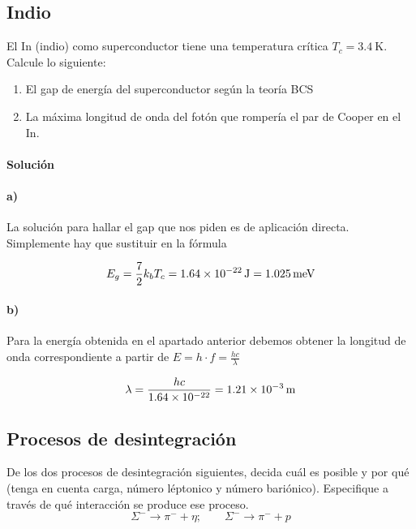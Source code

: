 \documentclass[12pt, a4paper]{article}
\begin{document}
    \subsection{Indio}
    El In (indio) como superconductor tiene una temperatura crítica ${T_c=\SI{3.4}{\kelvin}}$. Calcule
    lo siguiente:
    \begin{enumerate}[label=\alph*)]
        \item El gap de energía del superconductor según la teoría BCS
        \item La máxima longitud de onda del fotón que rompería el par de Cooper en el In.
    \end{enumerate}

    \paragraph{\textbf{Solución}}
    \paragraph{a)} La solución para hallar el gap que nos piden es de aplicación directa. Simplemente hay
    que sustituir en la fórmula

    $$E_g=\frac{7}{2} k_b T_c = \SI{1.64d-22}{\J} = \SI{1.025}{\milli\electronvolt}$$

    \paragraph{b)} Para la energía obtenida en el apartado anterior debemos obtener la longitud
    de onda correspondiente a partir de $E=h\cdot f = \frac{h c}{\lambda}$

    $$\lambda = \frac{h c}{\num{1.64d-22}} = \SI{1.21d-3}{\meter}$$




    \subsection{Procesos de desintegración}
    De los dos procesos de desintegración siguientes, decida cuál es posible y por qué
    (tenga en cuenta carga, número léptonico y número bariónico). Especifique a través
    de qué interacción se produce ese proceso.
    $$\Sigma^{-} \rightarrow \pi^{-} + \eta;   \quad \quad \Sigma^{-} \rightarrow \pi^{-} + p$$
\end{document}
